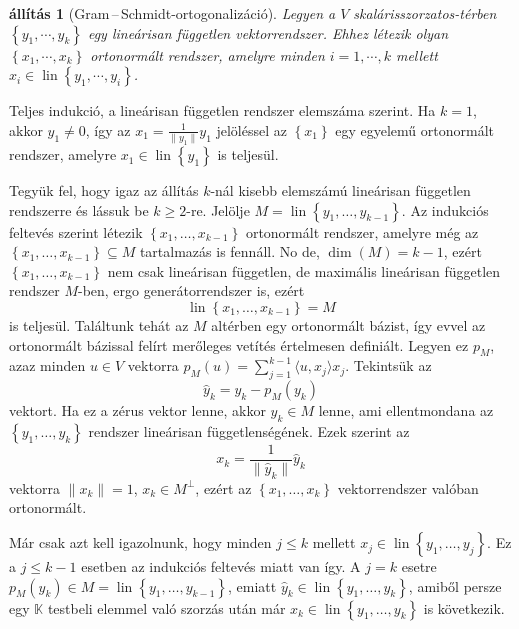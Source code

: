 \documentclass[9pt, a4paper, showtrims]{memoir}
\makeatletter
\renewenvironment{proof}[1][\proofname]
    {\par\pushQED{\qed}%
    \normalfont \topsep6\p@\@plus6\p@\relax
    \trivlist
    \item[\hskip\labelsep
        \itshape
    #1\@addpunct{:}]\ignorespaces}
    {\popQED\endtrivlist\@endpefalse}
\theoremstyle{plain}
\newtheorem{proposition}{állítás}[chapter]
\theoremstyle{remark}
\theoremstyle{definition}
\DeclareMathOperator{\lin}{lin}
\newcommand{\ip}[2]{\langle#1,#2\rangle}
\makeatother
\begin{document}
\begin{proposition}[Gram\,--\,Schmidt-ortogonalizáció]\label{pr:GS}
	Legyen a $V$ skalárisszorzatos-térben $\left\{ y_1,\cdots,y_k \right\}$ egy lineárisan független
	vektorrendszer.
	Ehhez létezik olyan $\left\{ x_1,\cdots,x_k \right\}$ ortonormált rendszer,
	amelyre minden $i=1,\cdots,k$ mellett $x_i\in\lin\left\{ y_1,\cdots,y_i \right\}$.
\end{proposition}
\begin{proof}
	Teljes indukció, a lineárisan független rendszer elemszáma szerint.
	Ha $k=1$, akkor $y_1\neq 0$, így az $x_1=\frac{1}{\|y_1\|}y_1$ jelöléssel az
	$\left\{ x_1 \right\}$ egy egyelemű ortonormált rendszer, amelyre $x_1\in\lin\left\{ y_1 \right\}$ is teljesül.

	Tegyük fel, hogy igaz az állítás $k$-nál kisebb elemszámú lineárisan független rendszerre és lássuk be $k\geq 2$-re.
	Jelölje $M=\lin\left\{ y_1,\ldots,y_{k-1} \right\}$.
	Az indukciós feltevés szerint létezik $\left\{ x_1,\ldots,x_{k-1} \right\}$ ortonormált rendszer,
	amelyre még az
	\begin{math}
		\left\{ x_1,\ldots,x_{k-1} \right\}\subseteq M
	\end{math}
	tartalmazás is fennáll.
	No de, $\dim(M)=k-1$, ezért $\left\{ x_1,\ldots,x_{k-1} \right\}$ nem csak lineárisan független,
	de maximális lineárisan független rendszer $M$-ben, ergo generátorrendszer is, ezért
	\[
		\lin\left\{ x_1,\ldots,x_{k-1} \right\}=M
	\]
	is teljesül.
	Találtunk tehát az $M$ altérben egy ortonormált bázist,
	így evvel az ortonormált bázissal felírt merőleges vetítés értelmesen definiált.
	Legyen ez $p_M$, azaz minden $u\in V$ vektorra $p_M\left( u \right)=\sum_{j=1}^{k-1}\ip{u}{x_j}x_j$.
	Tekintsük az
	\[
		\hat{y}_k=y_k-p_M\left( y_k \right)
	\]
	vektort.
	Ha ez a zérus vektor lenne, akkor $y_k\in M$ lenne, ami ellentmondana az $\left\{ y_1,\ldots,y_k \right\}$ rendszer
	lineárisan függetlenségének.
	Ezek szerint az
	\[
		x_k
		=
		\frac{1}{\|\hat{y}_k\|}\hat{y}_k
	\]
	vektorra $\|x_k\|=1$, $x_k\in M^\perp$, ezért az $\left\{ x_1,\ldots,x_k \right\}$ vektorrendszer valóban ortonormált.

	Már csak azt kell igazolnunk, hogy minden $j\leq k$ mellett $x_j\in\lin\left\{ y_1,\ldots,y_j \right\}$.
	Ez a $j\leq k-1$ esetben az indukciós feltevés miatt van így.
	A $j=k$ esetre $p_M\left( y_k \right)\in M=\lin\left\{ y_1,\ldots,y_{k-1} \right\}$,
	emiatt $\hat{y}_k\in\lin\left\{ y_1,\ldots,y_k \right\}$,
	amiből persze egy $\mathbb{K}$ testbeli elemmel való szorzás után már $x_k\in\lin\left\{ y_1,\ldots,y_k \right\}$ is következik.
\end{proof}
\end{document}
